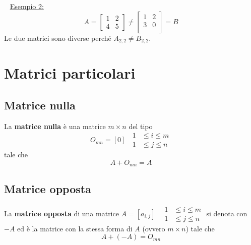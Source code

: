 \documentclass[12pt,oneside]{book}
\begin{document}
~\newline
\underline{Esempio 2:}
\begin{equation*}
    A=
    \begin{bmatrix}
        1 & 2 \\
        4 & 5
    \end{bmatrix}
    \neq
    \begin{bmatrix}
        1 & 2 \\
        3 & 0 \\
    \end{bmatrix}
    =B
\end{equation*}
Le due matrici sono diverse perché $A_{2,2} \neq B_{2,2}$.

\section{Matrici particolari}
\subsection{Matrice nulla}
La \textbf{matrice nulla} è una matrice $m \times n$ del tipo
\begin{equation*}
    O_{mn} = [0] \;\; \begin{aligned} 1&\le i\le m\\ 1&\le j\le n \end{aligned}
\end{equation*}
tale che
\begin{equation*}
    A + O_{mn} = A
\end{equation*}

\subsection{Matrice opposta}
La \textbf{matrice opposta} di una matrice $A = [a_{i,j}] \;\;$ \tiny$ \begin{aligned} 1&\le i\le m\\ 1&\le j\le n \end{aligned}$ \normalsize  \newline
si denota con $-A$ ed è la matrice con la stessa forma di $A$ (ovvero $m \times n$) tale che
\begin{equation*}
    A + (-A) = O_{mn}
\end{equation*}
\end{document}
